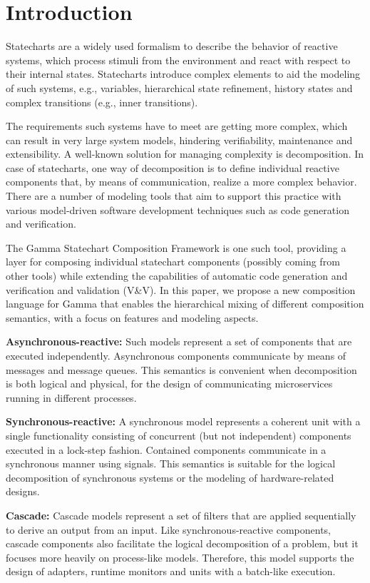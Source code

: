 \section{Introduction}
\label{sec:introduction}
Statecharts \cite{Harel:1987:SVF:34884.34886} are a widely used formalism to describe the behavior of reactive systems, which process stimuli from the environment and react with respect to their internal states. Statecharts introduce complex elements to aid the modeling of such systems, e.g., variables, hierarchical state refinement, history states and complex transitions (e.g., inner transitions).

The requirements such systems have to meet are getting more complex, which can result in very large system models, hindering verifiability, maintenance and extensibility. A well-known solution for managing complexity is decomposition. In case of statecharts, one way of decomposition is to define individual reactive components that, by means of communication, realize a more complex behavior. There are a number of modeling tools that aim to support this practice with various model-driven software development techniques such as code generation and verification.

The Gamma Statechart Composition Framework is one such tool, providing a layer for composing individual statechart components (possibly coming from other tools) while extending the capabilities of automatic code generation and verification and validation (V\&V). In this paper, we propose a new composition language for Gamma that enables the hierarchical mixing of different composition semantics, with a focus on features and modeling aspects.

\textbf{Asynchronous-reactive:} Such models represent a set of components that are executed independently. Asynchronous components communicate by means of messages and message queues. This semantics is convenient when decomposition is both logical and physical, \eg for the design of communicating microservices running in different processes.
	
\textbf{Synchronous-reactive:} A synchronous model represents a coherent unit with a single functionality consisting of concurrent (but not independent) components executed in a lock-step fashion. Contained components communicate in a synchronous manner using signals. This semantics is suitable for the logical decomposition of synchronous systems or the modeling of hardware-related designs.
	
\textbf{Cascade:} Cascade models represent a set of filters that are applied sequentially to derive an output from an input. Like synchronous-reactive components, cascade components also facilitate the logical decomposition of a problem, but it focuses more heavily on process-like models. Therefore, this model supports the design of adapters, runtime monitors and units with a batch-like execution.

